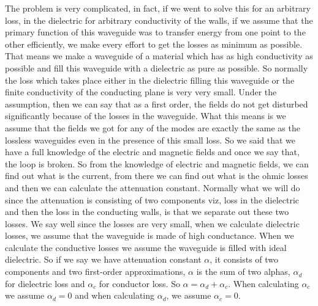 The problem is very complicated, in fact, if we went to solve this for an arbitrary loss, in the dielectric for arbitrary conductivity of the walls, if we assume that the primary function of this waveguide was to transfer energy from one point to the other efficiently, we make every effort to get the losses as minimum as possible. That means we make a waveguide of a material which has as high conductivity as possible and fill this waveguide with a dielectric as pure as possible. So normally the loss which takes place either in the dielectric filling this waveguide or the finite conductivity of the conducting plane is very very small. Under the assumption, then we can say that as a first order, the fields do not get disturbed significantly because of the losses in the waveguide. What this means is we assume that the fields we got for any of the modes are exactly the same as the lossless waveguides even in the presence of this small loss. So we said that we have a full knowledge of the electric and magnetic fields and once we say that, the loop is broken. So from the knowledge of electric and magnetic fields, we can find out what is the current, from there we can find out what is the ohmic losses and then we can calculate the attenuation constant. Normally what we will do since the attenuation is consisting of two components viz, loss in the dielectric and then the loss in the conducting walls, is that we separate out these two losses. We say well since the losses are very small, when we calculate dielectric losses, we assume that the waveguide is made of high conductance. When we calculate the conductive losses we assume the waveguide is filled with ideal dielectric. So if we say we have attenuation constant $\alpha$, it consists of two components and two first-order approximations, $\alpha$ is the sum of two alphas, $\alpha_{d}$ for dielectric loss and  $\alpha_{c}$ for conductor loss. So $\alpha =  \alpha_{d} +  \alpha_{c}$. When calculating $\alpha_{c}$ we assume  $\alpha_{d} = 0$ and when calculating  $\alpha_{d}$, we assume  $\alpha_{c} = 0$.
	
